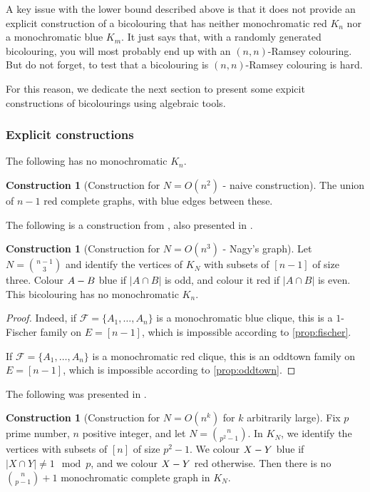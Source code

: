 \documentclass[12pt]{amsart}
\theoremstyle{definition}
\newtheorem{const}[thm]{Construction}
\newcommand{\FF}{\mathcal F}
\begin{document}
A key issue with the lower bound described above is that it does not provide an explicit construction of a bicolouring that has neither monochromatic red $K_n$ nor a monochromatic blue $K_m$.
It just says that, with a randomly generated bicolouring, you will most probably end up with an $(n, n)$-Ramsey colouring.
But do not forget, to test that a bicolouring is $(n, n)$-Ramsey colouring is hard.

For this reason, we dedicate the next section to present some expicit constructions of bicolourings using algebraic tools.

\subsubsection{Explicit constructions}

The following has no monochromatic $K_n$.

\begin{const}[Construction for $N = O(n^2)$ - naive construction]
The union of $n-1$ red complete graphs, with blue edges between these.
\end{const}

The following is a construction from \cite{nagy1972certain}, also presented in \cite{chung1981note}.

\begin{const}[Construction for $N = O(n^3)$ - Nagy's graph]
Let $N = \binom{n-1}{3}$ and identify the vertices of $K_N$ with subsets of $[n-1]$ of size three.
Colour $A \-- B$ blue if $|A \cap B|$ is odd, and colour it red if $|A\cap B|$ is even.
This bicolouring has no monochromatic $K_n$.
\end{const}

\begin{proof}
Indeed, if $\FF = \{A_1, \ldots, A_n\}$ is a monochromatic blue clique, this is a $1$-Fischer family on $E = [n-1]$, which is impossible according to \cref{prop:fischer}.

If $\FF = \{A_1, \ldots, A_n\}$ is a monochromatic red clique, this is an oddtown family on $E = [n-1]$, which is impossible according to \cref{prop:oddtown}.
\end{proof}

The following was presented in \cite{frankl1981intersection}.

\begin{const}[Construction for $N = O(n^k)$ for $k$ arbitrarily large]
Fix $p$ prime number, $n$ positive integer, and let $N=\binom{n}{p^2-1}$.
In $K_N$, we identify the vertices with subsets of $[n]$ of size $p^2-1$.
We colour $X \-- Y $ blue if $|X\cap Y| \neq 1 \mod p$, and we colour $X \-- Y $ red otherwise.
Then there is no $\binom{n}{p-1}+1$ monochromatic complete graph in $K_N$.
\end{const}
\end{document}
